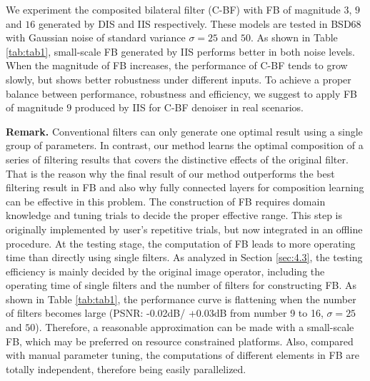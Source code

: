 \documentclass[twocolumn]{svjour3}          %
\begin{document}
We experiment the composited bilateral filter (C-BF) with FB of magnitude $3$, $9$ and $16$ generated by DIS and IIS respectively. These models are tested in BSD68 with Gaussian noise of standard variance $\sigma=25$ and $50$. As shown in Table \ref{tab:tab1}, small-scale FB generated by IIS performs better in both noise levels. When the magnitude of FB increases, the performance of C-BF tends to grow slowly, but shows better robustness under different inputs. To achieve a proper balance between performance, robustness and efficiency, we suggest to apply FB of magnitude $9$ produced by IIS for C-BF denoiser in real scenarios.

\textbf{Remark.} Conventional filters can only generate one optimal result using a single group of parameters. In contrast, our method learns the optimal composition of a series of filtering results that covers the distinctive effects of the original filter. That is the reason why the final result of our method outperforms the best filtering result in FB and also why fully connected layers for composition learning can be effective in this problem.
The construction of FB requires domain knowledge and tuning trials to decide the proper effective range. This step is originally implemented by user's repetitive trials, but now integrated in an offline procedure. At the testing stage, the computation of FB leads to more operating time than directly using single filters. As analyzed in Section \ref{sec:4.3}, the testing efficiency is mainly decided by the original image operator, including the operating time of single filters and the number of filters for constructing FB. As shown in Table \ref{tab:tab1}, the performance curve is flattening when the number of filters becomes large (PSNR: -0.02dB/ +0.03dB from number 9 to 16, $\sigma=25$ and $50$). Therefore, a reasonable approximation can be made with a small-scale FB, which may be preferred on resource constrained platforms. Also, compared with manual parameter tuning, the computations of different elements in FB are totally independent, therefore being easily parallelized.
\end{document}
